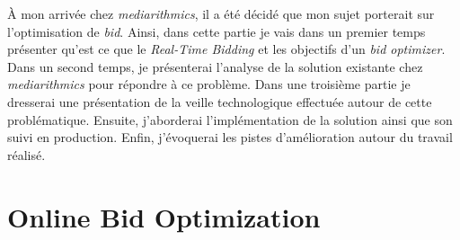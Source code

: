 
À mon arrivée chez \emph{mediarithmics}, il a été décidé que mon sujet porterait sur l'optimisation de \emph{bid}. 
Ainsi, dans cette partie je vais dans un premier temps présenter qu'est ce que le \emph{Real-Time Bidding} et les 
objectifs d'un \emph{bid optimizer}. Dans un second temps, je présenterai l'analyse de la solution existante chez 
\emph{mediarithmics} pour répondre à ce problème. Dans une troisième partie je dresserai une présentation de la 
veille technologique effectuée autour de cette problématique. Ensuite, j'aborderai l'implémentation de la solution 
ainsi que son suivi en production. Enfin, j'évoquerai les pistes d'amélioration autour du travail réalisé.
\section{Online Bid Optimization} 

